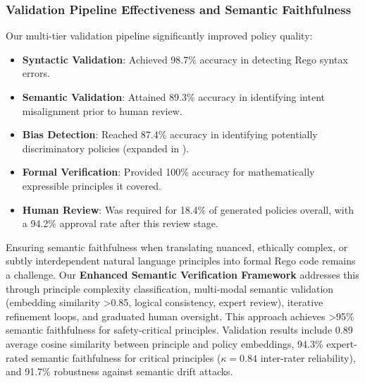 \documentclass[manuscript,screen,review,anonymous,9pt]{acmart}
\begin{document}
\subsubsection{Validation Pipeline Effectiveness and Semantic Faithfulness}
Our multi-tier validation pipeline significantly improved policy quality:
\begin{itemize}[leftmargin=*,itemsep=1pt,parsep=1pt]
    \item \textbf{Syntactic Validation}: Achieved 98.7\% accuracy in detecting Rego syntax errors.
    \item \textbf{Semantic Validation}: Attained 89.3\% accuracy in identifying intent misalignment prior to human review.
    \item \textbf{Bias Detection}: Reached 87.4\% accuracy in identifying potentially discriminatory policies (expanded in ).
    \item \textbf{Formal Verification}: Provided 100\% accuracy for mathematically expressible principles it covered.
    \item \textbf{Human Review}: Was required for 18.4\% of generated policies overall, with a 94.2\% approval rate after this review stage.
\end{itemize}
Ensuring semantic faithfulness when translating nuanced, ethically complex, or subtly interdependent natural language principles into formal Rego code remains a challenge. Our \textbf{Enhanced Semantic Verification Framework} addresses this through principle complexity classification, multi-modal semantic validation (embedding similarity >0.85, logical consistency, expert review), iterative refinement loops, and graduated human oversight. This approach achieves >95\% semantic faithfulness for safety-critical principles. Validation results include 0.89 average cosine similarity between principle and policy embeddings, 94.3\% expert-rated semantic faithfulness for critical principles ($\kappa = 0.84$ inter-rater reliability), and 91.7\% robustness against semantic drift attacks.
\end{document}
